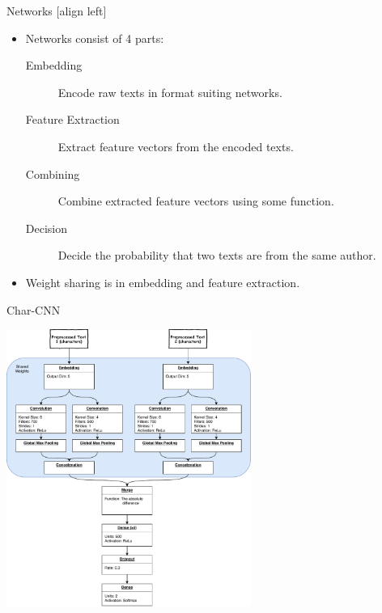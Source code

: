 \documentclass[10pt]{beamer}
\begin{document}
\begin{frame}[fragile]{Networks}
    [align left]
    \begin{itemize}
        \item Networks consist of 4 parts:

            \begin{description}
                \item[Embedding] Encode raw texts in format suiting networks.
                \item[Feature Extraction] Extract feature vectors from the
                    encoded texts.
                \item[Combining] Combine extracted feature vectors using some
                    function.
                \item[Decision] Decide the probability that two texts are from
                    the same author.
            \end{description}

        \item Weight sharing is in embedding and feature extraction.
    \end{itemize}
\end{frame}

\begin{frame}[fragile]{Char-CNN}
    \begin{center}
        \includegraphics[width=0.6\textwidth]{../../report/pictures/experiments/conv_char_nn/model}
    \end{center}
\end{frame}
\end{document}
